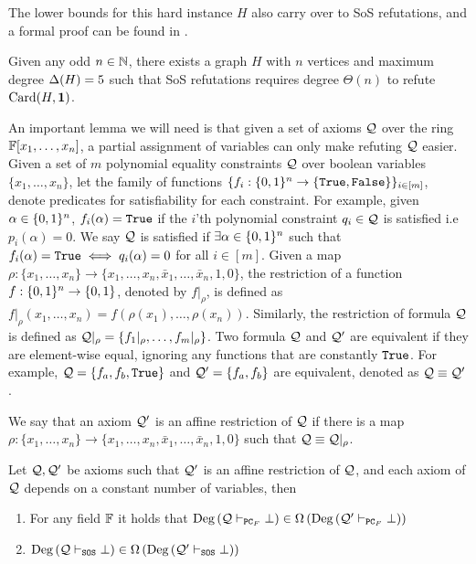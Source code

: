 \documentclass[11pt]{article}
\begin{document}
The lower bounds for this hard instance $H$ also carry over to SoS refutations, and a formal proof can be found in \citep[Theorem A.3]{Austrin_2022}.

\begin{lemma}\label{lemma:worst-case-instance-sos}
Given any odd $n \in \mathbb{N}$, there exists a graph $H$ with $n$ vertices and maximum degree $\Delta(H)= 5$ such that SoS refutations requires degree $\Theta(n)$ to refute $\text{Card}(H, \mathbf{1})$.
\end{lemma}

An important lemma we will need is that given a set of axioms $\mathcal{Q}$ over the ring $\mathbb{F}[x_1, \dots, x_n]$, a partial assignment of variables can only make refuting $\mathcal{Q}$ easier.
Given a set of $m$ polynomial equality constraints $\mathcal{Q}$ over boolean variables $\{x_1, \dots, x_n\}$, let the family of functions $\{f_i: \{0,1\}^n \rightarrow \{\texttt{True},\texttt{False}\} \}_{i \in [m]}$, denote predicates for satisfiability for each constraint.
For example, given $\alpha \in \{0,1\}^n$, $f_i(\alpha) = \texttt{True}$ if the $i$'th polynomial constraint $q_i \in \mathcal{Q}$ is satisfied i.e $p_i(\alpha) = 0$.
We say $\mathcal{Q}$ is satisfied if $\exists \alpha \in \{0,1\}^n$ such that $f_i(\alpha) = \texttt{True} \iff q_i(\alpha)=0$ for all $i \in [m]$.
Given a map $\rho: \{x_1, \dots, x_n \} \rightarrow \{x_1, \dots, x_n, \bar{x}_1, \dots, \bar{x}_n, 1, 0 \}$, the restriction of a function $f: \{0,1\}^n \rightarrow \{0,1\}$, denoted by $f|_\rho$, is defined as $f|_\rho(x_1, \dots, x_n) = f(\rho(x_1), \dots, \rho(x_n))$.
Similarly, the restriction of formula $\mathcal{Q}$ is defined as $\mathcal{Q}|_\rho = \{f_{1}|_\rho, \dots, f_{m}|_\rho \}$.
Two formula $\mathcal{Q}$ and $\mathcal{Q}'$ are equivalent if they are element-wise equal, ignoring any functions that are constantly $\texttt{True}$.
For example, $\mathcal{Q} = \{f_a, f_b, \texttt{True} \}$ and $\mathcal{Q}' = \{f_a, f_b\}$ are equivalent, denoted as $\mathcal{Q} \equiv \mathcal{Q}'$.


\begin{definition}\label{def:affine-restriction}
We say that an axiom $\mathcal{Q}'$ is an
affine restriction of $\mathcal{Q}$ if there is a map $\rho : \{x_1,\dots,x_n\} \rightarrow \{x_1, \dots, x_n, \bar{x}_1, \dots, \bar{x}_n, 1, 0 \}$ such that $\mathcal{Q} \equiv \mathcal{Q}|_{\rho}$.	
\end{definition}


\begin{lemma}\label{lemma:affine_restriction}
Let $\mathcal{Q}, \mathcal{Q}'$ be axioms such that $\mathcal{Q}'$ is an affine restriction of $\mathcal{Q}$, and each axiom
of $\mathcal{Q}$ depends on a constant number of variables, then 
\begin{enumerate}
	\item For any field $\mathbb{F}$ it holds that $\text{Deg}\left(\mathcal{Q} \vdash_{\texttt{PC}_F} \bot\right) \in \Omega\left(\text{Deg}\left(\mathcal{Q}' \vdash_{\texttt{PC}_F} \bot\right)\right)$
	\item $\text{Deg}\left(\mathcal{Q} \vdash_{\texttt{SOS}} \bot\right) \in \Omega\left(\text{Deg}\left(\mathcal{Q}' \vdash_{\texttt{SOS}} \bot\right)\right)$
\end{enumerate}
\end{lemma}
\end{document}
